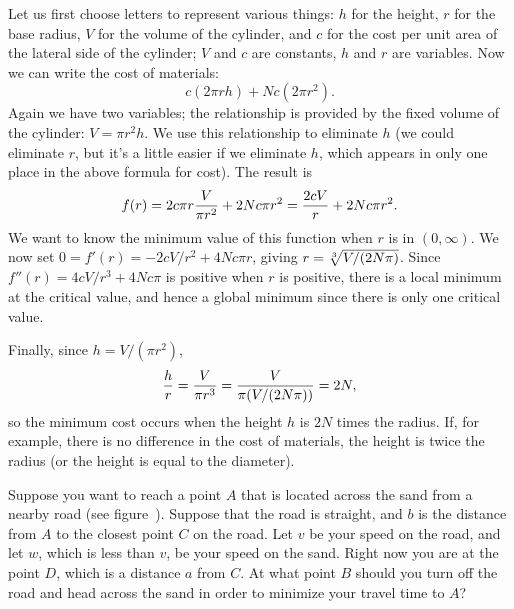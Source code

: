 \begin{solution}
Let us first choose letters to represent various things: $h$ for the
height, $r$ for the base radius, $V$ for the volume of the
cylinder, and $c$ for the cost per unit area of the lateral side of
the cylinder; $V$ and $c$ are constants, $h$ and $r$ are variables.
Now we can write the cost of materials:
$$
  c(2\pi rh)+Nc(2\pi r^2).
$$
Again we have two variables; the relationship is provided by the fixed
volume of the cylinder: $V=\pi r^2h$. We use this
relationship to eliminate $h$ (we could eliminate $r$, but it's a little easier
if we eliminate $h$, which appears in only one place in the above formula
for cost).  The result is
$$
   f(r)=2c\pi r{V\over\pi r^2}+2Nc\pi r^2={2cV\over r}+2Nc\pi r^2.
$$
We want to know the minimum value of this function when $r$ is in
$(0,\infty)$. 
We now set $0=f'(r)=-2cV/r^2+4Nc\pi
r$, giving $r={\root 3 \of {V/(2N\pi)}}$.  
Since $f''(r)=4cV/r^3+4Nc\pi$ is positive when $r$ is positive, there
is a local minimum at the critical value, and hence a global minimum
since there is only one critical value.

Finally, since $h=V/(\pi r^2)$, 
$$
{h\over r}={V\over\pi r^3}={V\over \pi(V/(2N\pi))}=2N,
$$ 
so the minimum cost occurs when the height $h$ is $2N$ times the
radius. If, for example, there is no difference in the cost of
materials, the height is twice the radius (or the height is equal to
the diameter).
\end{solution}


\begin{example} Suppose you want to reach a point $A$ that is located across the
sand from a nearby road (see figure~).
Suppose that the road is straight, and $b$ is the distance from $A$ to
the closest point $C$ on the road.  Let $v$ be your speed on the road,
and let $w$, which is less than $v$, be your speed on the sand.  Right
now you are at the point $D$, which is a distance $a$ from $C$.  At
what point $B$ should you turn off the road and head across the sand
in order to minimize your travel time to $A$?
\end{example}

